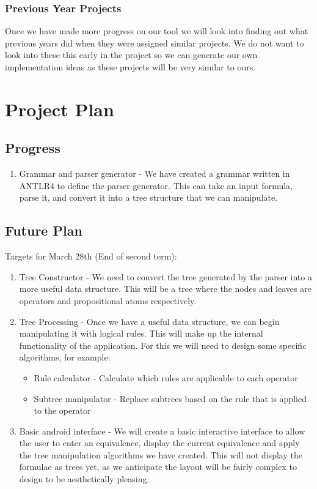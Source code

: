 \documentclass{report}
\begin{document}
\subsection{Previous Year Projects}

Once we have made more progress on our tool we will look into finding out what previous years did when they were assigned similar projects. We do not want to look into these this early in the project so we can generate our own implementation ideas as these projects will be very similar to ours.

\chapter{Project Plan}

\section{Progress}

\begin{enumerate}
\item Grammar and parser generator - We have created a grammar written in ANTLR4 to define the parser generator. This can take an input formula, parse it, and convert it into a tree structure that we can manipulate.
\end{enumerate}

\section{Future Plan}

Targets for March 28th (End of second term):

\begin{enumerate}
\item Tree Constructor - We need to convert the tree generated by the parser into a more useful data structure. This will be a tree where the nodes and leaves are operators and propositional atoms respectively.
\item Tree Processing - Once we have a useful data structure, we can begin manipulating it with logical rules. This will make up the internal functionality of the application. For this we will need to design some specific algorithms, for example:

\begin{itemize}
\item Rule calculator - Calculate which rules are applicable to each operator
\item Subtree manipulator - Replace subtrees based on the rule that is applied to the operator
\end{itemize}

\item Basic android interface - We will create a basic interactive interface to allow the user to enter an equivalence, display the current equivalence and apply the tree manipulation algorithms we have created. This will not display the formulae as trees yet, as we anticipate the layout will be fairly complex to design to be aesthetically pleasing.
\end{enumerate}
\end{document}
